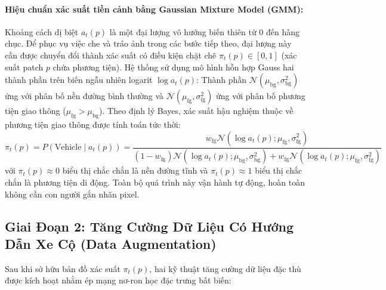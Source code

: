 \documentclass[11pt,a4paper]{article}
\begin{document}
\paragraph{Hiệu chuẩn xác suất tiền cảnh bằng Gaussian Mixture Model (GMM):}
Khoảng cách dị biệt $a_t(p)$ là một đại lượng vô hướng biến thiên từ 0 đến hàng chục. Để phục vụ việc che và tráo ảnh trong các bước tiếp theo, đại lượng này cần được chuyển đổi thành xác suất có điều kiện chặt chẽ $\pi_t(p) \in [0, 1]$ (xác suất patch $p$ chứa phương tiện). 
Hệ thống sử dụng mô hình hỗn hợp Gauss hai thành phần trên biến ngẫu nhiên logarit $\log a_t(p)$: Thành phần $\mathcal{N}(\mu_{\text{bg}}, \sigma_{\text{bg}}^2)$ ứng với phân bố nền đường bình thường và $\mathcal{N}(\mu_{\text{fg}}, \sigma_{\text{fg}}^2)$ ứng với phân bố phương tiện giao thông ($\mu_{\text{fg}} > \mu_{\text{bg}}$). Theo định lý Bayes, xác suất hậu nghiệm thuộc về phương tiện giao thông được tính toán tức thời:
\begin{equation}
    \pi_t(p) = P(\text{Vehicle} \mid a_t(p)) = \frac{w_{\text{fg}} \mathcal{N}\left(\log a_t(p); \mu_{\text{fg}}, \sigma_{\text{fg}}^2\right)}{(1 - w_{\text{fg}}) \mathcal{N}\left(\log a_t(p); \mu_{\text{bg}}, \sigma_{\text{bg}}^2\right) + w_{\text{fg}} \mathcal{N}\left(\log a_t(p); \mu_{\text{fg}}, \sigma_{\text{fg}}^2\right)}
\end{equation}
với $\pi_t(p) \approx 0$ biểu thị chắc chắn là nền đường tĩnh và $\pi_t(p) \approx 1$ biểu thị chắc chắn là phương tiện di động. Toàn bộ quá trình này vận hành tự động, hoàn toàn không cần con người gắn nhãn pixel.

\subsection{Giai Đoạn 2: Tăng Cường Dữ Liệu Có Hướng Dẫn Xe Cộ (Data Augmentation)}
Sau khi sở hữu bản đồ xác suất $\pi_t(p)$, hai kỹ thuật tăng cường dữ liệu đặc thù được kích hoạt nhằm ép mạng nơ-ron học đặc trưng bất biến:
\end{document}

